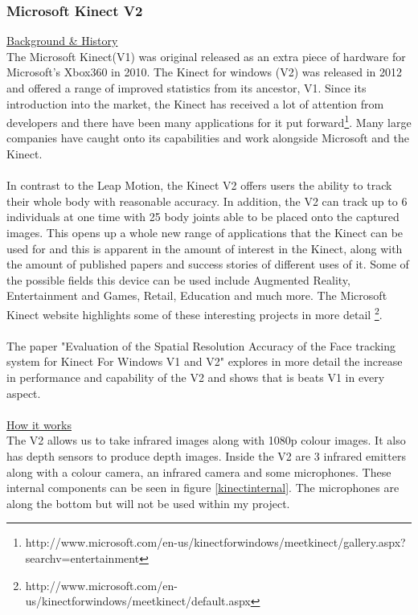 \documentclass[11pt]{report}
\begin{document}
\subsubsection*{Microsoft Kinect V2}
\underline{Background \& History}\\
The Microsoft Kinect(V1) was original released as an extra piece of hardware
for Microsoft's Xbox360 in 2010. The Kinect for windows (V2) was released
in 2012 and offered a range of improved statistics from its ancestor,
V1. Since its introduction into the market, the Kinect has received a lot of
attention from developers and there have been many applications for it put
forward\footnote{http://www.microsoft.com/en-us/kinectforwindows/meetkinect/gallery.aspx?searchv=entertainment}.
Many large companies have caught onto its capabilities and work 
alongside Microsoft and the Kinect.
\\ \\
In contrast to the Leap Motion, the Kinect V2 offers users the ability to track their 
whole body with reasonable accuracy. In addition, the V2 can track up to 6 individuals
at one time with 25 body joints able to be placed onto the captured images.
This opens up a whole new range of applications
that the Kinect can be used for and this is apparent in the amount of interest in the
Kinect, along with the amount of published papers and success stories of different
uses of it. Some of the possible fields this device can be used include 
Augmented Reality, Entertainment and Games, Retail, Education and much more. The 
Microsoft Kinect website highlights some of these interesting projects in more detail
\footnote{http://www.microsoft.com/en-us/kinectforwindows/meetkinect/default.aspx}.
\\ \\ 
The paper "Evaluation of the Spatial Resolution Accuracy of the Face 
tracking system for Kinect For Windows V1 and V2" \cite{AmonFuhrmann14}
explores in more detail the increase in performance and capability
of the V2 and shows that is beats V1 in every aspect. 
\\ \\
\underline{How it works} \\ 
The V2 allows us to take infrared images along with 1080p colour images. It 
also has depth sensors to produce depth images. Inside the V2 are 3 infrared
emitters along with a colour camera, an infrared camera and some microphones.
These internal components can be seen in figure \ref{kinectinternal}. The
microphones are along the bottom but will not be used within my project. 
\end{document}
